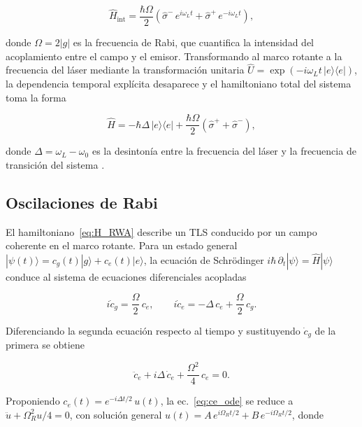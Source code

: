 \begin{equation}
	\hat{H}_\text{int} = \frac{\hbar\Omega}{2}\left(
	\hat{\sigma}^-\,e^{i\omega_L t} + \hat{\sigma}^+\,e^{-i\omega_L t}
	\right),
	\label{eq:Hint_RWA}
\end{equation}

donde $\Omega = 2|g|$ es la frecuencia de Rabi, que cuantifica la intensidad del acoplamiento entre el campo y el emisor. Transformando al marco rotante a la frecuencia del láser mediante la transformación unitaria $\hat{U} = \exp\!\left(-i\omega_L t\,|e\rangle\langle e|\right)$, la dependencia temporal explícita desaparece y el hamiltoniano total del sistema toma la forma

\begin{equation}
	\hat{H} = -\hbar\Delta\,|e\rangle\langle e| +
	\frac{\hbar\Omega}{2}\left(\hat{\sigma}^+ + \hat{\sigma}^-\right),
	\label{eq:H_RWA}
\end{equation}

donde $\Delta = \omega_L - \omega_0$ es la desintonía entre la frecuencia del láser y la frecuencia de transición del sistema \cite{gerry2005,fox2006}.

\subsection{Oscilaciones de Rabi}
\label{sec:rabi}

El hamiltoniano~\eqref{eq:H_RWA} describe un TLS conducido por un campo coherente en el marco rotante. Para un estado general $|\psi(t)\rangle = c_g(t)|g\rangle + c_e(t)|e\rangle$, la ecuación de Schrödinger $i\hbar\,\partial_t|\psi\rangle = \hat{H}|\psi\rangle$ conduce al sistema de ecuaciones diferenciales acopladas

\begin{equation}
	i\dot{c}_g = \frac{\Omega}{2}\,c_e, \qquad
	i\dot{c}_e = -\Delta\,c_e + \frac{\Omega}{2}\,c_g.
	\label{eq:bloch_eqs}
\end{equation}

Diferenciando la segunda ecuación respecto al tiempo y sustituyendo $\dot{c}_g$ de la primera se obtiene

\begin{equation}
	\ddot{c}_e + i\Delta\,\dot{c}_e + \frac{\Omega^2}{4}\,c_e = 0.
	\label{eq:ce_ode}
\end{equation}

Proponiendo $c_e(t) = e^{-i\Delta t/2}\,u(t)$, la ec.~\eqref{eq:ce_ode} se reduce a $\ddot{u} + \Omega_R^2 u/4 = 0$, con solución general $u(t) = A\,e^{i\Omega_R t/2} + B\,e^{-i\Omega_R t/2}$, donde

